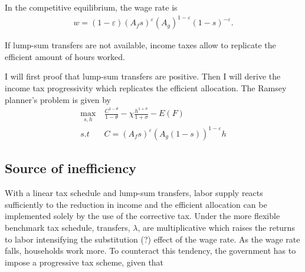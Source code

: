 In the competitive equilibrium, the wage rate is
\begin{align}
w= (1-\varepsilon)(A_fs)^\varepsilon (A_g)^{1-\varepsilon}(1-s)^{-\varepsilon}. \label{eq:compw}
\end{align}


\begin{prop}
	If lump-sum transfers are not available, income taxes allow to replicate the efficient amount of hours worked.
\end{prop}

I will first proof that lump-sum transfers are positive. Then I will derive the income tax progressivity which replicates the efficient allocation. 
The Ramsey planner's problem is given by
\begin{align}
\underset{s, h}{\max}\ & \frac{C^{1-\theta}}{1-\theta}-\chi \frac{h^{1+\sigma}}{1+\sigma}-E(F)\\
s.t\ \ & C=\left(A_fs\right)^{\varepsilon}\left(A_g(1-s)\right)^{1-\varepsilon}h
\end{align}

\subsection{Source of inefficiency}
With a linear tax schedule and lump-sum transfers, labor supply reacts sufficiently to the reduction in income and the efficient allocation can be implemented solely by the use of the corrective tax. Under the more flexible benchmark tax schedule, transfers, $\lambda$, are multiplicative which raises the returns to labor intensifying the substitution (?) effect of the wage rate. As the wage rate falls, households work more. To counteract this tendency, the government has to impose a progressive tax scheme, given that 


